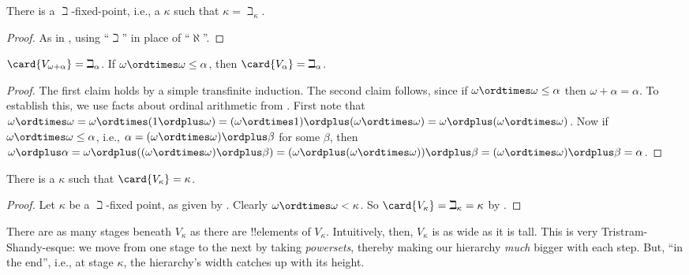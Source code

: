 \documentclass[../../../include/open-logic-section]{subfiles}
\begin{document}
\begin{prop}
There is a $\beth$-fixed-point, i.e., a $\kappa$ such that $\kappa=
\beth_\kappa$.
\end{prop}

\begin{proof}
As in , using ``$\beth$'' in place of ``$\aleph$''. 
\end{proof}

\begin{prop}
$\card{V_{\omega+\alpha}} = \beth_{\alpha}$. If $\omega \ordtimes
\omega \leq \alpha$, then $\card{V_\alpha} = \beth_\alpha$.
\end{prop}

\begin{proof}
The first claim holds by a simple transfinite induction. The second
claim follows, since if $\omega \ordtimes \omega \leq \alpha$ then
$\omega + \alpha = \alpha$. To establish this, we use facts about
ordinal arithmetic from . First note
that $\omega \ordtimes \omega = \omega \ordtimes (1 \ordplus \omega) =
(\omega  \ordtimes 1) \ordplus (\omega\ordtimes\omega) = \omega
\ordplus (\omega \ordtimes \omega)$. Now if $\omega \ordtimes \omega
\leq \alpha$, i.e., $\alpha = (\omega\ordtimes\omega) \ordplus \beta$
for some $\beta$, then $\omega \ordplus \alpha = \omega \ordplus
((\omega \ordtimes \omega) \ordplus \beta) = (\omega \ordplus (\omega
\ordtimes \omega)) \ordplus \beta = (\omega \ordtimes \omega) \ordplus
\beta = \alpha$. 
\end{proof}

\begin{cor}
There is a $\kappa$ such that $\card{V_\kappa} = \kappa$.
\end{cor}

\begin{proof}
Let $\kappa$ be a $\beth$-fixed point, as given by .
Clearly $\omega \ordtimes \omega < \kappa$. So $\card{V_\kappa} =
\beth_\kappa= \kappa$ by .
\end{proof}

There are as many stages beneath $V_\kappa$ as there are !!{element}s
of $V_\kappa$. Intuitively, then, $V_\kappa$ is as wide as it is tall.
This is very Tristram-Shandy-esque: we move from one stage to the next
by taking \emph{powersets}, thereby making our hierarchy \emph{much}
bigger with each step. But, ``in the end'', i.e., at stage $\kappa$,
the hierarchy's width catches up with its height. 
\end{document}
